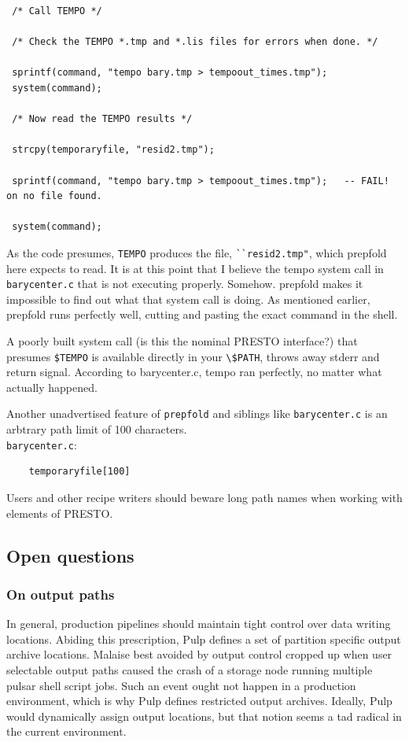 \documentclass[a4paper,10pt,bibtotoc]{scrartcl}
\begin{document}
\begin{verbatim}
 /* Call TEMPO */                                                

 /* Check the TEMPO *.tmp and *.lis files for errors when done. */ 

 sprintf(command, "tempo bary.tmp > tempoout_times.tmp");        
 system(command);                                                

 /* Now read the TEMPO results */                              

 strcpy(temporaryfile, "resid2.tmp");                           

 sprintf(command, "tempo bary.tmp > tempoout_times.tmp");   -- FAIL! on no file found.

 system(command);
\end{verbatim}

As the code presumes, \verb|TEMPO| produces the file, \verb|``resid2.tmp"|, which 
prepfold here expects to read.  It is at this point that I believe 
the tempo system call in \verb|barycenter.c| that is not executing properly. 
Somehow.  prepfold makes it impossible to find out what that system 
call is doing.  As mentioned earlier, prepfold runs perfectly well, 
cutting and pasting the exact command in the shell.

A poorly built system call (is this the nominal PRESTO interface?)
that presumes \verb|$TEMPO| is available directly in your \verb|\$PATH|, throws
away stderr and return signal. According to barycenter.c, tempo ran 
perfectly, no matter what actually happened.

Another unadvertised feature of \verb|prepfold| and siblings like
\verb|barycenter.c| is an arbtrary path limit of 100
characters.\\
\verb|barycenter.c|:
\begin{verbatim}
    temporaryfile[100]
\end{verbatim}
Users and other recipe writers should beware long path names when
working with elements of PRESTO.

\subsection{Open questions}
\label{sec:open-questions}
\subsubsection{On output paths}
In general, production pipelines should maintain tight control over
data writing locations.  Abiding this prescription, Pulp defines a set
of partition specific output archive locations. Malaise best avoided by output control
cropped up when user selectable output paths caused the crash of a
storage node running multiple pulsar shell script jobs.  Such an event
ought not happen in a production environment, which is why Pulp
defines restricted output archives.  Ideally, Pulp would dynamically
assign output locations, but that notion seems a tad radical in the
current environment.
\end{document}

